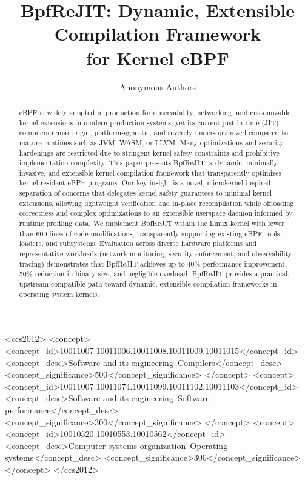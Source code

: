 \documentclass[sigconf,anonymous]{acmart}
\begin{document}
\title{BpfReJIT: Dynamic, Extensible Compilation Framework\\for Kernel eBPF}

\author{Anonymous Authors}

\begin{abstract}
eBPF is widely adopted in production for observability, networking, and customizable kernel extensions in modern production systems, yet its current just-in-time (JIT) compilers remain rigid, platform-agnostic, and severely under-optimized compared to mature runtimes such as JVM, WASM, or LLVM. Many optimizations and security hardenings are restricted due to stringent kernel safety constraints and prohibitive implementation complexity. This paper presents BpfReJIT, a dynamic, minimally invasive, and extensible kernel compilation framework that transparently optimizes kernel-resident eBPF programs. Our key insight is a novel, microkernel-inspired separation of concerns that delegates kernel safety guarantees to minimal kernel extensions, allowing lightweight verification and in-place recompilation while offloading correctness and complex optimizations to an extensible userspace daemon informed by runtime profiling data. We implement BpfReJIT within the Linux kernel with fewer than 600 lines of code modifications, transparently supporting existing eBPF tools, loaders, and subsystems. Evaluation across diverse hardware platforms and representative workloads (network monitoring, security enforcement, and observability tracing) demonstrates that BpfReJIT achieves up to 40\% performance improvement, 50\% reduction in binary size, and negligible overhead. BpfReJIT provides a practical, upstream-compatible path toward dynamic, extensible compilation frameworks in operating system kernels.
\end{abstract}

\begin{CCSXML}
<ccs2012>
  <concept>
    <concept_id>10011007.10011006.10011008.10011009.10011015</concept_id>
    <concept_desc>Software and its engineering~Compilers</concept_desc>
    <concept_significance>500</concept_significance>
  </concept>
  <concept>
    <concept_id>10011007.10011074.10011099.10011102.10011103</concept_id>
    <concept_desc>Software and its engineering~Software performance</concept_desc>
    <concept_significance>300</concept_significance>
  </concept>
  <concept>
    <concept_id>10010520.10010553.10010562</concept_id>
    <concept_desc>Computer systems organization~Operating systems</concept_desc>
    <concept_significance>300</concept_significance>
  </concept>
</ccs2012>
\end{CCSXML}
\end{document}
